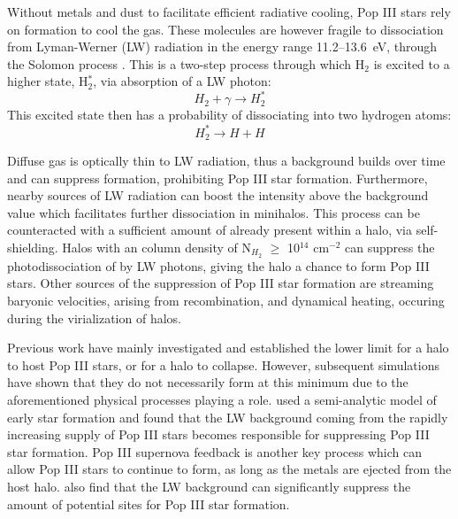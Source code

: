 \documentclass[a4paper,fleqn,usenatbib]{mnras}
\begin{document}
Without metals and dust to facilitate efficient radiative cooling, Pop III stars rely on \hh{} formation to cool the gas. These molecules are however fragile to dissociation from Lyman-Werner (LW) radiation in the energy range 11.2--13.6~eV, through the Solomon process \citep{Field66, Stecher67}. This is a two-step process through which H$_{2}$ is excited to a higher state, H$_{2}^{\ast}$, via absorption of a LW photon:
\begin{equation} \label{Solomon1}
	H_{2} + \gamma \rightarrow  H_{2}^{\ast}
\end{equation}
This excited state then has a probability of dissociating into two hydrogen atoms:
\begin{equation} \label{Solomon2}
	H_{2}^{\ast} \rightarrow H + H
\end{equation}

Diffuse gas is optically thin to LW radiation, thus a background builds over time and can suppress \hh{} formation, prohibiting Pop III star formation. Furthermore, nearby sources of LW radiation can boost the intensity above the background value which facilitates further \hh{} dissociation in minihalos. This process can be counteracted with a sufficient amount of \hh{} already present within a halo, via \hh{} self-shielding. Halos with an \hh{} column density of N$_{H_{2}}$ $\geq$ 10$^{14}$ cm$^{-2}$ can suppress the photodissociation of \hh{} by LW photons, giving the halo a chance to form Pop III stars. Other sources of the suppression of Pop III star formation are streaming baryonic velocities, arising from recombination, and dynamical heating, occuring during the virialization of halos. 

Previous work have mainly investigated and established the lower limit for a halo to host Pop III stars, or for a halo to collapse. However, subsequent simulations have shown that they do not necessarily form at this minimum due to the aforementioned physical processes playing a role. \citet{Mebane18} used a semi-analytic model of early star formation and found that the LW background coming from the rapidly increasing supply of Pop III stars becomes responsible for suppressing Pop III star formation. Pop III supernova feedback is another key process which can allow Pop III stars to continue to form, as long as the metals are ejected from the host halo. \citet{Griffen18} also find that the LW background can significantly suppress the amount of potential sites for Pop III star formation. 
\end{document}
